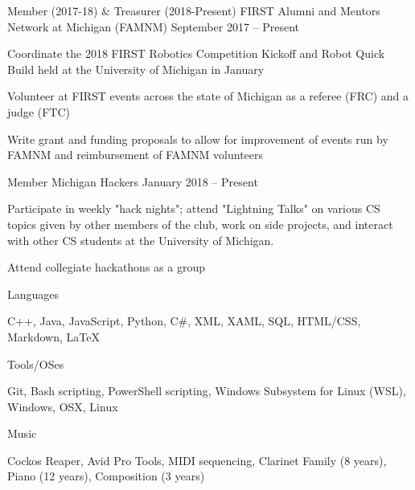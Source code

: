 \documentclass[]{awesome-cv}
\begin{document}
	\vspace{-4mm}
	\cventry
	{Member (2017-18) \& Treasurer (2018-Present)}
	{FIRST Alumni and Mentors Network at Michigan (FAMNM)}
	{}
	{September 2017 – Present}
	{\begin{cvitems}
		\item {Coordinate the 2018 FIRST Robotics Competition Kickoff and Robot Quick Build held at the University of Michigan in January}
		\item {Volunteer at FIRST events across the state of Michigan as a referee (FRC) and a judge (FTC)}
		\item {Write grant and funding proposals to allow for improvement of events run by FAMNM and reimbursement of FAMNM volunteers}
		\end{cvitems}}
	
	\vspace{-4mm}
	\cventry
	{Member}
	{Michigan Hackers}
	{}
	{January 2018 – Present}
	{\begin{cvitems}
		\item {Participate in weekly "hack nights"; attend "Lightning Talks" on various CS topics given by other members of the club, work on side projects, and interact with other CS students at the University of Michigan.}
		\item {Attend collegiate hackathons as a group}
		\end{cvitems}}
	\vspace{-4mm}
\vspace{-2mm}
\vspace{-3mm}
	\cventry
	{}
	{Languages}
	{}
	{}
	{\begin{cvitems}
		\vspace{-7mm}
		\item {C++, Java, JavaScript, Python, C\#, XML, XAML, SQL, HTML/CSS, Markdown, LaTeX}
		\end{cvitems}}

	\vspace{-8mm}
	\cventry
	{}
	{Tools/OSes}
	{}
	{}
	{\begin{cvitems}
		\vspace{-7mm}
		\item {Git, Bash scripting, PowerShell scripting, Windows Subsystem for Linux (WSL), Windows, OSX, Linux}
		\end{cvitems}}
	
	\vspace{-8mm}
	\cventry
	{}
	{Music}
	{}
	{}
	{\begin{cvitems}
		\vspace{-7mm}
		\item {Cockos Reaper, Avid Pro Tools, MIDI sequencing, Clarinet Family (8 years), Piano (12 years), Composition (3 years)}
		\end{cvitems}}
	\vspace{-4mm}
\end{document}
